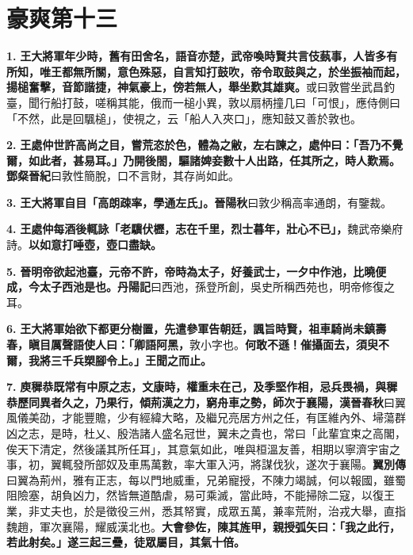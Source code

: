 \chapter{豪爽第十三}

\textbf{1.} \textbf{王大將軍年少時，舊有田舍名，語音亦楚，武帝喚時賢共言伎蓺事，人皆多有所知，唯王都無所關，意色殊惡，自言知打鼓吹，帝令取鼓與之，於坐振袖而起，揚槌奮擊，音節諧捷，神氣豪上，傍若無人，舉坐歎其雄爽。}{\footnotesize 或曰敦嘗坐武昌釣臺，聞行船打鼓，嗟稱其能，俄而一槌小異，敦以扇柄撞几曰「可恨」，應侍側曰「不然，此是回颿槌」，使視之，云「船人入夾口」，應知鼓又善於敦也。}

\textbf{2.} \textbf{王處仲世許高尚之目，嘗荒恣於色，體為之敝，左右諫之，處仲曰：「吾乃不覺爾，如此者，甚易耳。」乃開後閤，驅諸婢妾數十人出路，任其所之，時人歎焉。}{\footnotesize \textbf{鄧粲晉紀}曰敦性簡脫，口不言財，其存尚如此。}

\textbf{3.} \textbf{王大將軍自目「高朗疎率，學通左氏」。}{\footnotesize \textbf{晉陽秋}曰敦少稱高率通朗，有鑒裁。}

\textbf{4.} \textbf{王處仲每酒後輒詠「老驥伏櫪，志在千里，烈士暮年，壯心不已」，}{\footnotesize 魏武帝樂府詩。}\textbf{以如意打唾壺，壺口盡缺。}

\textbf{5.} \textbf{晉明帝欲起池臺，元帝不許，帝時為太子，好養武士，一夕中作池，比曉便成，今太子西池是也。}{\footnotesize \textbf{丹陽記}曰西池，孫登所創，吳史所稱西苑也，明帝修復之耳。}

\textbf{6.} \textbf{王大將軍始欲下都更分樹置，先遣參軍告朝廷，諷旨時賢，祖車騎尚未鎮壽春，瞋目厲聲語使人曰：「卿語阿黑，}{\footnotesize 敦小字也。}\textbf{何敢不遜！催攝面去，須臾不爾，我將三千兵槊腳令上。」王聞之而止。}

\textbf{7.} \textbf{庾穉恭既常有中原之志，文康時，權重未在己，及季堅作相，忌兵畏禍，與穉恭歷同異者久之，乃果行，傾荊漢之力，窮舟車之勢，師次于襄陽，}{\footnotesize \textbf{漢晉春秋}曰翼風儀美劭，才能豐贍，少有經緯大略，及繼兄亮居方州之任，有匡維內外、埽蕩群凶之志，是時，杜乂、殷浩諸人盛名冠世，翼未之貴也，常曰「此輩宜束之高閣，俟天下清定，然後議其所任耳」，其意氣如此，唯與桓溫友善，相期以寧濟宇宙之事，初，翼輒發所部奴及車馬萬數，率大軍入沔，將謀伐狄，遂次于襄陽。\textbf{翼別傳}曰翼為荊州，雅有正志，每以門地威重，兄弟寵授，不陳力竭誠，何以報國，雖蜀阻險塞，胡負凶力，然皆無道酷虐，易可乘滅，當此時，不能掃除二寇，以復王業，非丈夫也，於是徵役三州，悉其帑實，成眾五萬，兼率荒附，治戎大舉，直指魏趙，軍次襄陽，耀威漢北也。}\textbf{大會參佐，陳其旌甲，親授弧矢曰：「我之此行，若此射矣。」遂三起三疊，徒眾屬目，其氣十倍。}

